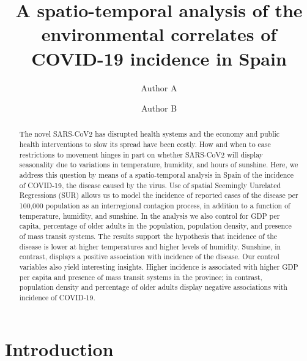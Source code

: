 \documentclass[]{elsarticle} %
\begin{document}
\begin{frontmatter}

  \title{A spatio-temporal analysis of the environmental correlates of COVID-19
incidence in Spain}
    \author[Some School]{Author A}
    \author[Some Institute]{Author B}
      \address[Some School]{School of the Things}
    \address[Some Institute]{Institute of Everything}
    \address[Departamento de Economia]{}
  
  \begin{abstract}
  The novel SARS-CoV2 has disrupted health systems and the economy and
  public health interventions to slow its spread have been costly. How and
  when to ease restrictions to movement hinges in part on whether
  SARS-CoV2 will display seasonality due to variations in temperature,
  humidity, and hours of sunshine. Here, we address this question by means
  of a spatio-temporal analysis in Spain of the incidence of COVID-19, the
  disease caused by the virus. Use of spatial Seemingly Unrelated
  Regressions (SUR) allows us to model the incidence of reported cases of
  the disease per 100,000 population as an interregional contagion
  process, in addition to a function of temperature, humidity, and
  sunshine. In the analysis we also control for GDP per capita, percentage
  of older adults in the population, population density, and presence of
  mass transit systems. The results support the hypothesis that incidence
  of the disease is lower at higher temperatures and higher levels of
  humidity. Sunshine, in contrast, displays a positive association with
  incidence of the disease. Our control variables also yield interesting
  insights. Higher incidence is associated with higher GDP per capita and
  presence of mass transit systems in the province; in contrast,
  population density and percentage of older adults display negative
  associations with incidence of COVID-19.
  \end{abstract}
  
 \end{frontmatter}

\hypertarget{introduction}{%
\section{Introduction}\label{introduction}}
\end{document}
